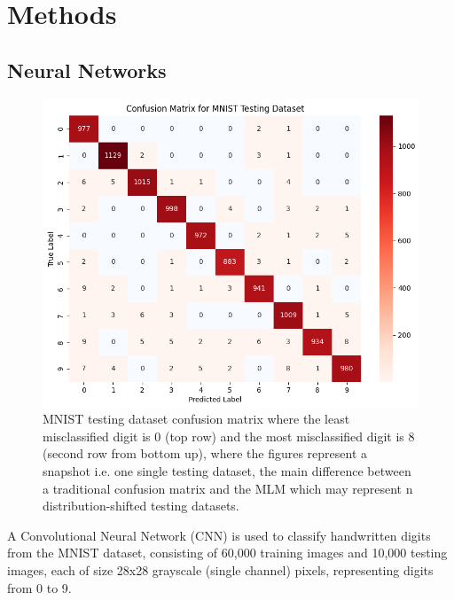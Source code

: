 
\section{Methods}


\subsection{Neural Networks}


\begin{figure}[h]
    \centering
    \includegraphics[width=0.99\columnwidth]{Figures/mnist_testing_dataset_confusion_matrix.png}   
    \caption{MNIST testing dataset confusion matrix where the least misclassified digit is 0 (top row) and the most misclassified digit is 8 (second row from bottom up), where the figures represent a snapshot i.e. one single testing dataset, the main difference between a traditional confusion matrix and the MLM which may represent n distribution-shifted testing datasets.}
\label{fig:mnist_testing_dataset_confusion_matrix}
\end{figure}

A Convolutional Neural Network (CNN) is used to classify handwritten digits from the MNIST dataset, consisting of 60,000 training images and 10,000 testing images, each of size 28x28 grayscale (single channel) pixels, representing digits from 0 to 9.

